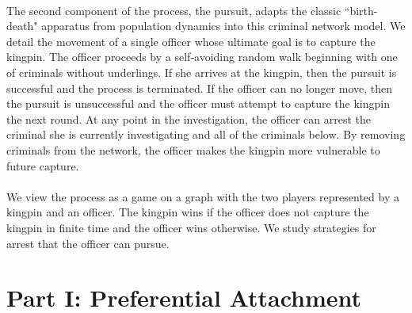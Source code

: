 \documentclass[%
 reprint,
 amsmath,amssymb,
 aps,
]{revtex4-1}
\theoremstyle{plain}
\theoremstyle{definition}
\begin{document}
\\
The second component of the process, the pursuit, adapts the classic ``birth-death" apparatus from population dynamics \cite{kendall, gardiner} into this criminal network model.  We detail the movement of a single officer whose ultimate goal is to capture the kingpin.  The officer proceeds by a self-avoiding random walk beginning with one of criminals without underlings.  If she arrives at the kingpin, then the pursuit is successful and the process is terminated.  If the officer can no longer move, then the pursuit is unsuccessful and the officer must attempt to capture the kingpin the next round.  At any point in the investigation, the officer can arrest the criminal she is currently investigating and all of the criminals below.  By removing criminals from the network, the officer makes the kingpin more vulnerable to future capture.\\
\\
We view the process as a game on a graph with the two players represented by a kingpin and an officer.  The kingpin wins if the officer does not capture the kingpin in finite time and the officer wins otherwise.  We study strategies for arrest that the officer can pursue.


\section*{Part I: Preferential Attachment}
\end{document}
